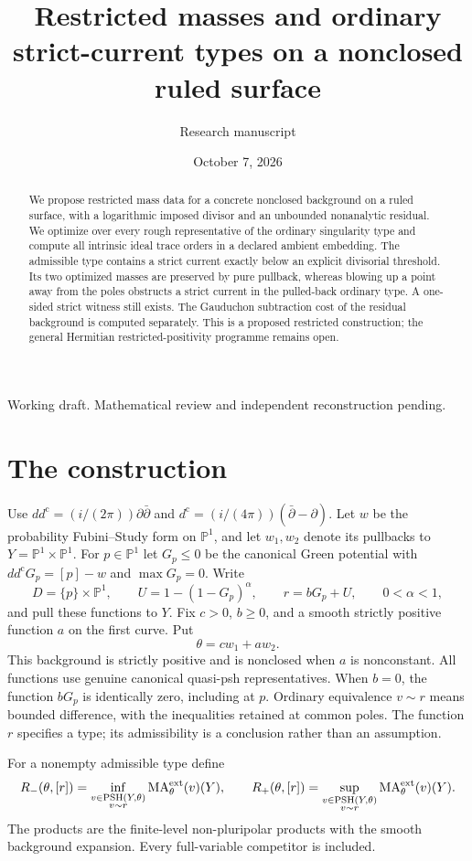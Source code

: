 \documentclass[11pt]{article}
\title{Restricted masses and ordinary strict-current types\newline
on a nonclosed ruled surface}
\author{Research manuscript}
\date{October 7, 2026}
\theoremstyle{remark}
\newcommand{\ddc}{dd^{\mathrm c}}
\newcommand{\dc}{d^{\mathrm c}}
\newcommand{\PSH}{\operatorname{PSH}}
\newcommand{\MA}{\operatorname{MA}}
\newcommand{\PP}{\mathbb P}
\begin{document}
\maketitle
\begin{center}
\small Working draft. Mathematical review and independent reconstruction pending.
\end{center}
\begin{abstract}
We propose restricted mass data for a concrete nonclosed background on a
ruled surface, with a logarithmic imposed divisor and an unbounded
nonanalytic residual. We optimize over every rough representative of the
ordinary singularity type and compute all intrinsic ideal trace orders in
a declared ambient embedding. The admissible type contains a strict current
exactly below an explicit divisorial threshold. Its two optimized masses
are preserved by pure pullback, whereas blowing up a point away from the
poles obstructs a strict current in the pulled-back ordinary type. A
one-sided strict witness still exists. The Gauduchon subtraction cost of
the residual background is computed separately. This is a proposed
restricted construction; the general Hermitian restricted-positivity
programme remains open.
\end{abstract}

\section{The construction}
Use $\ddc=(i/(2\pi))\partial\bar\partial$ and
$\dc=(i/(4\pi))(\bar\partial-\partial)$. Let $w$ be the probability
Fubini--Study form on $\PP^1$, and let $w_1,w_2$ denote its pullbacks to
$Y=\PP^1\times\PP^1$. For $p\in\PP^1$ let $G_p\leq0$ be the canonical
Green potential with $\ddc G_p=[p]-w$ and $\max G_p=0$. Write
\[
 D=\{p\}\times\PP^1,\qquad
 U=1-(1-G_p)^\alpha,\qquad
 r=bG_p+U,\qquad 0<\alpha<1,
\]
and pull these functions to $Y$. Fix $c>0$, $b\geq0$, and a smooth
strictly positive function $a$ on the first curve. Put
\[
 \theta=cw_1+aw_2.
\]
This background is strictly positive and is nonclosed when $a$ is
nonconstant. All functions use genuine canonical quasi-psh representatives.
When $b=0$, the function $bG_p$ is identically zero, including at $p$.
Ordinary equivalence $v\sim r$ means bounded difference, with the
inequalities retained at common poles. The function $r$ specifies a type;
its admissibility is a conclusion rather than an assumption.

For a nonempty admissible type define
\[
 R_-(\theta,[r])=\inf_{\substack{v\in\PSH(Y,\theta)\\v\sim r}}
                   \MA^{\rm ext}_\theta(v)(Y),\qquad
 R_+(\theta,[r])=\sup_{\substack{v\in\PSH(Y,\theta)\\v\sim r}}
                   \MA^{\rm ext}_\theta(v)(Y).
\]
The products are the finite-level non-pluripolar products with the smooth
background expansion. Every full-variable competitor is included.
\end{document}
